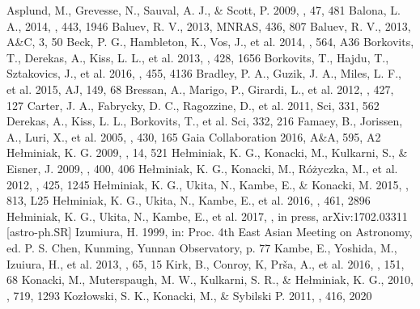 \documentclass{aa}
\begin{document}
\begin{thebibliography}{}
 Asplund, M., Grevesse, N., Sauval, A. J., \& Scott, P. 2009, \araa, 47, 481
 Balona, L. A., 2014, \mnras, 443, 1946
 Baluev, R. V., 2013, MNRAS, 436, 807
 Baluev, R. V., 2013, A\&C, 3, 50
 Beck, P. G., Hambleton, K., Vos, J., et al. 2014, \aap, 564, A36%
 Borkovits, T., Derekas, A., Kiss, L. L., et al. 2013, \mnras, 428, 1656
 Borkovits, T., Hajdu, T., Sztakovics, J., et al. 2016, \mnras, 455, 4136
 Bradley, P. A., Guzik, J. A., Miles, L. F., et al. 2015, AJ, 149, 68
 Bressan, A., Marigo, P., Girardi, L., et al. 2012, \mnras, 427, 127
 Carter, J. A., Fabrycky, D. C., Ragozzine, D., et al. 2011, Sci, 331, 562
 Derekas, A., Kiss, L. L., Borkovits, T., et al.  Sci, 332, 216
 Famaey, B., Jorissen, A., Luri, X., et al. 2005, \aap, 430, 165
 Gaia Collaboration 2016, A\&A, 595, A2
 He\l miniak, K. G. 2009, \na, 14, 521
 He\l miniak, K. G., Konacki, M., Kulkarni, S., \& Eisner, J. 2009, \mnras, 400, 406
 He\l miniak, K. G., Konacki, M., R\'o\.zyczka, M., et al. 2012, \mnras, 425, 1245
 He\l miniak, K. G., Ukita, N., Kambe, E., \& Konacki, M. 2015, \apjl, 813, L25
 He\l miniak, K. G., Ukita, N., Kambe, E., et al. 2016, \mnras, 461, 2896
 He\l miniak, K. G., Ukita, N., Kambe, E., et al. 2017, \mnras, in press, arXiv:1702.03311 [astro-ph.SR]
 Izumiura, H. 1999, in: Proc. 4th East Asian Meeting on Astronomy, ed. P. S. Chen, Kunming, Yunnan Observatory, p. 77
 Kambe, E., Yoshida, M., Izuiura, H., et al. 2013, \pasj, 65, 15%
 Kirk, B., Conroy, K, Pr\v{s}a, A., et al. 2016, \aj, 151, 68%
 Konacki, M., Muterspaugh, M. W., Kulkarni, S. R., \& He\l miniak, K. G., 2010, \apj, 719, 1293
 Koz{\l}owski, S. K., Konacki, M., \& Sybilski P. 2011, \mnras, 416, 2020

\end{thebibliography}
\end{document}

